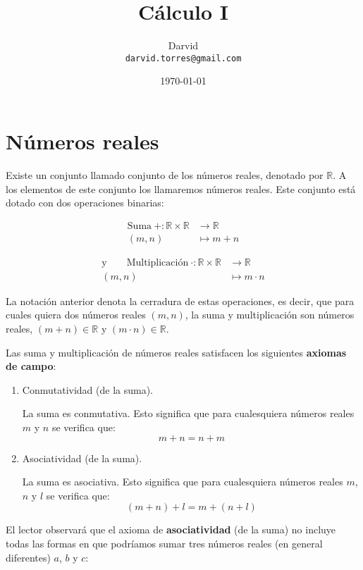 \documentclass[11pt]{article}
\newcommand{\R}{\mathbb{R}}
\begin{document}
\title{\vspace{-2cm}Cálculo I}
\author{Darvid \\ \texttt{darvid.torres@gmail.com}}
\date{\today}
\maketitle
\thispagestyle{empty}

\section*{Números reales}

Existe un conjunto llamado conjunto de los números reales, denotado por $\R$. A los elementos de este conjunto los llamaremos números reales. Este conjunto está dotado con dos operaciones binarias:\vspace{-0.5cm}
\begin{center}
\noindent\begin{minipage}[r]{5.5cm}
\begin{align*}
    \text{Suma} \ + : \R \times \R &\to \R\\
    (m,n) &\mapsto m+n
\end{align*}
\end{minipage}%
\begin{minipage}[l]{6.5cm}
\begin{align*}
    \text{y} \qquad \text{Multiplicación} \ \cdot : \R \times \R &\to \R\\
    (m,n) &\mapsto m \cdot n
\end{align*}
\end{minipage}
\end{center}

La notación anterior denota la cerradura de estas operaciones, es decir, que para cuales quiera dos números reales $(m,n)$, la suma y multiplicación son números reales, $(m+n)\in \R$ y $(m\cdot n)\in \R$.

Las suma y multiplicación de números reales satisfacen los siguientes \textbf{axiomas de campo}:

\begin{enumerate}[label=S\arabic*.]
    \item Conmutatividad (de la suma).
    
    La suma es conmutativa. Esto significa que para cualesquiera números reales $m$ y $n$ se verifica que:\[ m+n = n+m
    \]
    \item Asociatividad (de la suma).
    
    La suma es asociativa. Esto significa que para cualesquiera números reales $m$, $n$ y $l$ se verifica que: \[(m+ n)+l = m+(n+ l)
    \]
\end{enumerate}
\vspace{-1em}
El lector observará que el axioma de \textbf{asociatividad} (de la suma) no incluye todas las formas en que podríamos sumar tres números reales (en general diferentes) $a$, $b$ y $c$:
\end{document}

